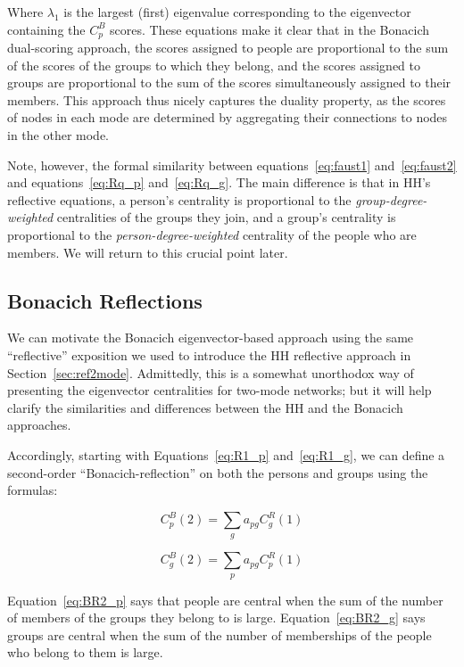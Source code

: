 \documentclass[a4paper,fleqn]{cas-sc}
\begin{document}
Where $\lambda_1$ is the largest (first) eigenvalue corresponding to the eigenvector containing the $C^B_p$ scores. These equations make it clear that in the Bonacich dual-scoring approach, the scores assigned to people are proportional to the sum of the scores of the groups to which they belong, and the scores assigned to groups are proportional to the sum of the scores simultaneously assigned to their members. This approach thus nicely captures the duality property, as the scores of nodes in each mode are determined by aggregating their connections to nodes in the other mode. 

Note, however, the formal similarity between equations~\ref{eq:faust1} and~\ref{eq:faust2} and equations~\ref{eq:Rq_p} and~\ref{eq:Rq_g}. The main difference is that in HH's reflective equations, a person's centrality is proportional to the \textit{group-degree-weighted} centralities of the groups they join, and a group's centrality is proportional to the \textit{person-degree-weighted} centrality of the people who are members. We will return to this crucial point later.

\subsection{Bonacich Reflections} \label{subsec:bonref}
We can motivate the Bonacich eigenvector-based approach using the same ``reflective'' exposition we used to introduce the HH reflective approach in Section~\ref{sec:ref2mode}. Admittedly, this is a somewhat unorthodox way of presenting the eigenvector centralities for two-mode networks; but it will help clarify the similarities and differences between the HH and the Bonacich approaches. 

Accordingly, starting with Equations~\ref{eq:R1_p} and~\ref{eq:R1_g}, we can define a second-order ``Bonacich-reflection'' on both the persons and groups using the formulas:

\begin{equation}
   C^B_p(2) = \sum_g a_{pg}C^R_g(1)
   \label{eq:BR2_p}
\end{equation} 

\begin{equation}
   C^B_g(2) = \sum_p a_{pg}C^R_p(1)
   \label{eq:BR2_g}
\end{equation}

Equation~\ref{eq:BR2_p} says that people are central when the sum of the number of members of the groups they belong to is large. Equation~\ref{eq:BR2_g} says groups are central when the sum of the number of memberships of the people who belong to them is large. 
\end{document}
